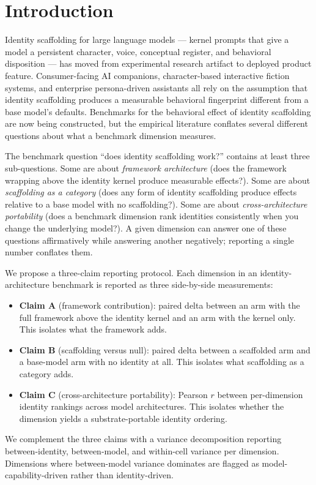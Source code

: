 \documentclass[11pt]{article}
\begin{document}
\section{Introduction}
\label{sec:intro}

Identity scaffolding for large language models --- kernel prompts that give a model a persistent character, voice, conceptual register, and behavioral disposition --- has moved from experimental research artifact to deployed product feature. Consumer-facing AI companions, character-based interactive fiction systems, and enterprise persona-driven assistants all rely on the assumption that identity scaffolding produces a measurable behavioral fingerprint different from a base model's defaults. Benchmarks for the behavioral effect of identity scaffolding are now being constructed, but the empirical literature conflates several different questions about what a benchmark dimension measures.

The benchmark question ``does identity scaffolding work?'' contains at least three sub-questions. Some are about \emph{framework architecture} (does the framework wrapping above the identity kernel produce measurable effects?). Some are about \emph{scaffolding as a category} (does any form of identity scaffolding produce effects relative to a base model with no scaffolding?). Some are about \emph{cross-architecture portability} (does a benchmark dimension rank identities consistently when you change the underlying model?). A given dimension can answer one of these questions affirmatively while answering another negatively; reporting a single number conflates them.

We propose a three-claim reporting protocol. Each dimension in an identity-architecture benchmark is reported as three side-by-side measurements:
\begin{itemize}
    \item \textbf{Claim A} (framework contribution): paired delta between an arm with the full framework above the identity kernel and an arm with the kernel only. This isolates what the framework adds.
    \item \textbf{Claim B} (scaffolding versus null): paired delta between a scaffolded arm and a base-model arm with no identity at all. This isolates what scaffolding as a category adds.
    \item \textbf{Claim C} (cross-architecture portability): Pearson $r$ between per-dimension identity rankings across model architectures. This isolates whether the dimension yields a substrate-portable identity ordering.
\end{itemize}
We complement the three claims with a variance decomposition reporting between-identity, between-model, and within-cell variance per dimension. Dimensions where between-model variance dominates are flagged as model-capability-driven rather than identity-driven.
\end{document}
